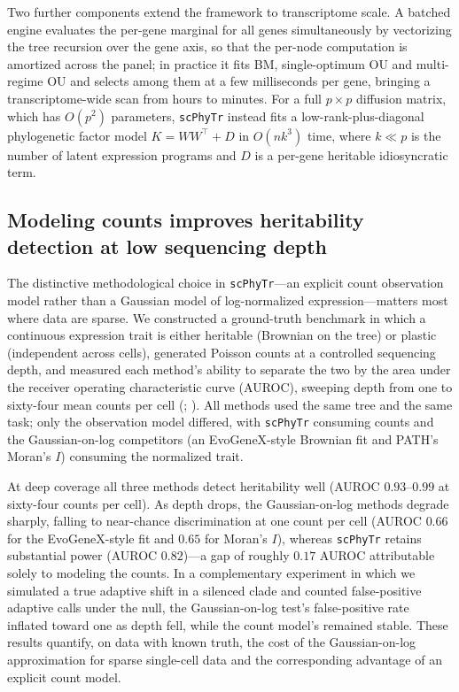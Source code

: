 \documentclass{article}
\newcommand{\scphytr}{\texttt{scPhyTr}}
\begin{document}
Two further components extend the framework to transcriptome scale. A batched engine
evaluates the per-gene marginal for all genes simultaneously by vectorizing the tree
recursion over the gene axis, so that the per-node computation is amortized across the
panel; in practice it fits BM, single-optimum OU and multi-regime OU and selects among
them at a few milliseconds per gene, bringing a transcriptome-wide scan from hours to
minutes. For a full $p\times p$ diffusion matrix, which has $O(p^2)$ parameters,
\scphytr{} instead fits a low-rank-plus-diagonal phylogenetic factor model
$K = WW^\top + D$ in $O(nk^3)$ time, where $k\ll p$ is the number of latent expression
programs and $D$ is a per-gene heritable idiosyncratic term.

\subsection*{Modeling counts improves heritability detection at low sequencing depth}

The distinctive methodological choice in \scphytr{}---an explicit count observation model
rather than a Gaussian model of log-normalized expression---matters most where data are
sparse. We constructed a ground-truth benchmark in which a continuous expression trait is
either heritable (Brownian on the tree) or plastic (independent across cells), generated
Poisson counts at a controlled sequencing depth, and measured each method's ability to
separate the two by the area under the receiver operating characteristic curve (AUROC),
sweeping depth from one to sixty-four mean counts per cell (;
). All methods used the same tree and the same task; only the
observation model differed, with \scphytr{} consuming counts and the Gaussian-on-log
competitors (an EvoGeneX-style Brownian fit and PATH's Moran's $I$) consuming the
normalized trait.

At deep coverage all three methods detect heritability well (AUROC $0.93$--$0.99$ at
sixty-four counts per cell). As depth drops, the Gaussian-on-log methods degrade sharply,
falling to near-chance discrimination at one count per cell (AUROC $0.66$ for the
EvoGeneX-style fit and $0.65$ for Moran's $I$), whereas \scphytr{} retains substantial
power (AUROC $0.82$)---a gap of roughly $0.17$ AUROC attributable solely to modeling the
counts. In a complementary experiment in which we simulated a true adaptive shift in a
silenced clade and counted false-positive adaptive calls under the null, the
Gaussian-on-log test's false-positive rate inflated toward one as depth fell, while the
count model's remained stable. These results quantify, on data with known truth, the cost
of the Gaussian-on-log approximation for sparse single-cell data and the corresponding
advantage of an explicit count model.
\end{document}
